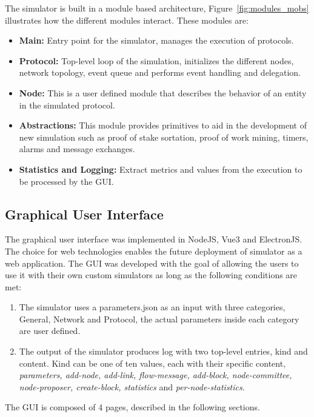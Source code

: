 The simulator is built in a module based architecture, Figure~\ref{fig:modules_mobs} illustrates
how the different modules interact. These modules are:
\begin{itemize}
  \item \textbf{Main:} Entry point for the simulator, manages the execution of
protocols.
  \item \textbf{Protocol:} Top-level loop of the simulation, initializes the different
nodes, network topology, event queue and performs event handling and delegation.
  \item \textbf{Node:} This is a user defined module that describes the behavior
of an entity in the simulated protocol.
  \item \textbf{Abstractions:} This module provides primitives to aid in the
development of new simulation such as proof of stake sortation, proof of work mining,
timers, alarms and message exchanges.
  \item \textbf{Statistics and Logging:}  Extract metrics and values from the execution
to be processed by the GUI.
\end{itemize}

\subsection{Graphical User Interface}\label{subsec:grafical_user_interface}

The graphical user interface was implemented in NodeJS, Vue3 and ElectronJS.
The choice for web technologies enables the future deployment of simulator as
a web application. The GUI was developed with the goal of allowing the users
to use it with their own custom simulators as long as the following conditions are met:

\begin{enumerate}
  \item The simulator uses a parameters.json as an input with three categories,
General, Network and Protocol, the actual parameters inside each category are user defined.
  \item The output of the simulator produces log with two top-level entries, kind and content.
Kind can be one of ten values, each with their specific content, \textit{parameters, 
add-node, add-link, flow-message, add-block, node-committee, node-proposer, create-block,
statistics} and \textit{per-node-statistics}.
\end{enumerate}

The GUI is composed of 4 pages, described in the following sections.

